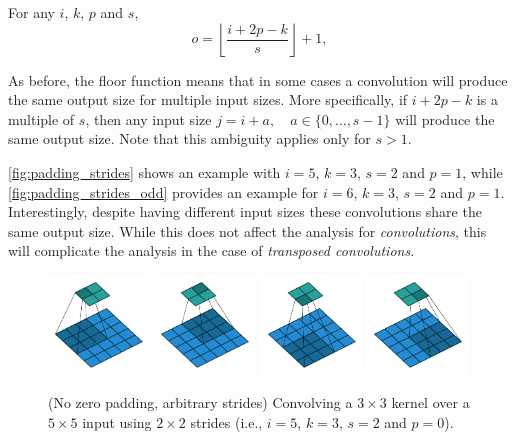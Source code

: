 \begin{relationship}\label{rel:padding_strides}
For any $i$, $k$, $p$ and $s$,
\begin{equation*}
    o = \left\lfloor \frac{i + 2p - k}{s} \right\rfloor + 1,
\end{equation*}
\end{relationship}

\noindent As before, the floor function means that in some cases a convolution
will produce the same output size for multiple input sizes. More specifically,
if $i + 2p - k$ is a multiple of $s$, then any input size $j = i + a, \quad a
\in \{0,\ldots,s - 1\}$ will produce the same output size. Note that this
ambiguity applies only for $s > 1$.

\autoref{fig:padding_strides} shows an example with $i = 5$, $k = 3$, $s = 2$
and $p = 1$, while \autoref{fig:padding_strides_odd} provides an example for
$i = 6$, $k = 3$, $s = 2$ and $p = 1$. Interestingly, despite having different
input sizes these convolutions share the same output size. While this does not
affect the analysis for {\em convolutions}, this will complicate the analysis
in the case of {\em transposed convolutions}.

\begin{figure}[p]
    \centering
    \includegraphics[width=0.24\textwidth]{pdf/no_padding_strides_00.pdf}
    \includegraphics[width=0.24\textwidth]{pdf/no_padding_strides_01.pdf}
    \includegraphics[width=0.24\textwidth]{pdf/no_padding_strides_02.pdf}
    \includegraphics[width=0.24\textwidth]{pdf/no_padding_strides_03.pdf}
    \caption{\label{fig:no_padding_strides} (No zero padding, arbitrary
        strides) Convolving a $3 \times 3$ kernel over a $5 \times 5$ input
        using $2 \times 2$ strides (i.e., $i = 5$, $k = 3$, $s = 2$ and
        $p = 0$).}
\end{figure}


